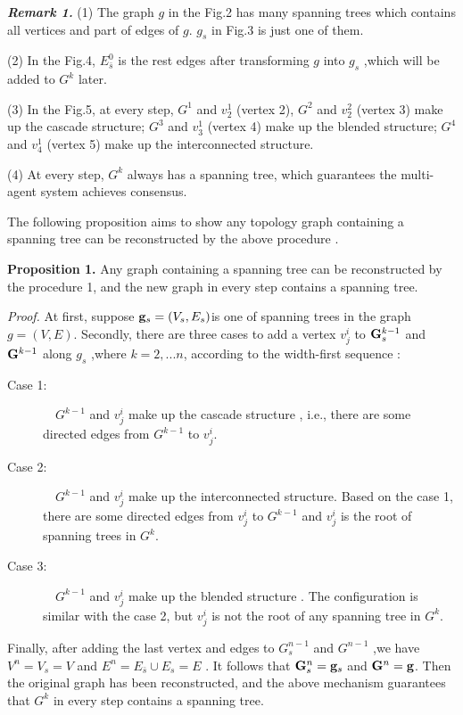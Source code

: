\documentclass[english]{cccconf}
\begin{document}
{\emph{\textbf{Remark 1.}}
(1) The graph $g$  in the Fig.2 has many spanning trees which contains all vertices and part of edges of $g$. $g_s$  in Fig.3 is just one of them.

(2)  In the Fig.4, $E_{\bar s}^0$ is the rest edges after transforming $g$  into $g_s$ ,which will be added to $G^k$  later.

(3) In the Fig.5, at every step, $G^1$ and $v_2^1$ (vertex 2),  $G^2$ and $v_2^2$  (vertex 3) make up the cascade structure;  $G^3$ and $v_3^1$   (vertex 4) make up the blended structure;  $G^4$ and $v_4^1$  (vertex 5) make up the interconnected structure.

(4) At every step,  $G^k$ always has a spanning tree, which guarantees the multi-agent system achieves consensus.

The following proposition aims to  show any topology graph containing a spanning tree can be reconstructed by the above  procedure .

\textbf{Proposition 1.}  Any graph containing a spanning tree can be reconstructed by the procedure 1, and the new graph in every step contains a spanning tree.

\emph{Proof. }At first, suppose  ${{\bf{g}}_s} = ({V_s},{E_s})$is one of  spanning trees in the graph $g=(V,E)$. Secondly, there are three cases to add a vertex $v_j^i$  to ${\bf{G}}_s^{k - 1}$ and ${\bf{G}}^{k - 1}$ along $g_s$  ,where  $k = 2,...n$, according to the width-first sequence :

\begin{description}
  \item[Case 1:]~~$G^{k-1}$ and $v^i_j$ make up the cascade structure , i.e., there are some directed edges from $G^{k-1}$   to  $v^i_j$.
  \item[Case 2:]~~$G^{k-1}$ and $v^i_j$  make up the interconnected structure. Based on the case 1, there are some directed edges from  $v^i_j$ to $G^{k-1}$  and  $v^i_j$  is the root of spanning trees in $G^{k}$.
  \item[Case 3:]~~$G^{k-1}$ and $v^i_j$   make up the blended structure . The configuration is similar with the case 2, but   $v^i_j$ is not the root of  any spanning tree in $G^{k}$.
\end{description}
 Finally, after adding the last vertex  and edges to $G^{n-1}_s$ and $G^{n-1}$  ,we have ${V^n} = {V_s} = V$   and ${E^n} = {E_{\bar s}} \cup {E_s} = E$ . It follows that ${\bf{G}}_s^n = {{\bf{g}}_s}$ and ${\bf{G}}_{}^n = {\bf{g}}$. Then the original graph has been reconstructed, and the above mechanism  guarantees that  $G^{k}$ in every step contains a spanning tree. 


}
\end{document}
